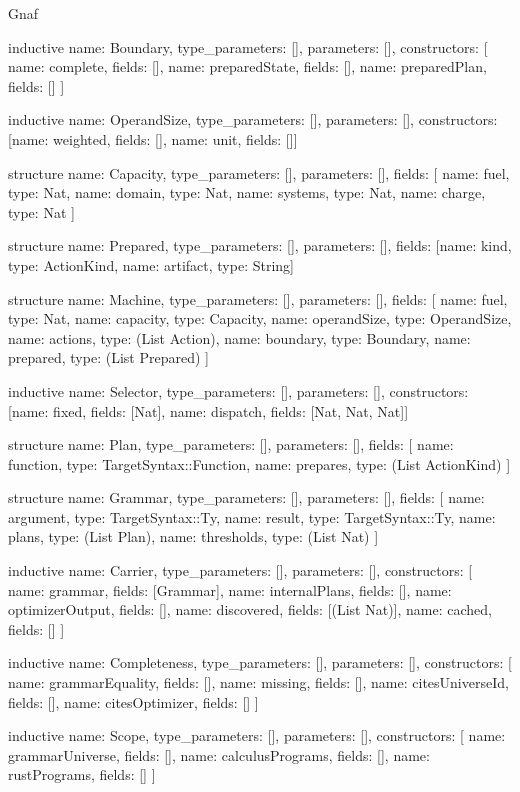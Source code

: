 \begin{lexlean}{Gnaf}
\begin{semanticmodule}
inductive{
  name: Boundary,
  type_parameters: [],
  parameters: [],
  constructors: [
    {name: complete, fields: []},
    {name: preparedState, fields: []},
    {name: preparedPlan, fields: []}
  ]
}

inductive{
  name: OperandSize,
  type_parameters: [],
  parameters: [],
  constructors: [{name: weighted, fields: []}, {name: unit, fields: []}]
}

structure{
  name: Capacity,
  type_parameters: [],
  parameters: [],
  fields: [
    {name: fuel, type: Nat},
    {name: domain, type: Nat},
    {name: systems, type: Nat},
    {name: charge, type: Nat}
  ]
}

structure{
  name: Prepared,
  type_parameters: [],
  parameters: [],
  fields: [{name: kind, type: ActionKind}, {name: artifact, type: String}]
}

structure{
  name: Machine,
  type_parameters: [],
  parameters: [],
  fields: [
    {name: fuel, type: Nat},
    {name: capacity, type: Capacity},
    {name: operandSize, type: OperandSize},
    {name: actions, type: (List Action)},
    {name: boundary, type: Boundary},
    {name: prepared, type: (List Prepared)}
  ]
}

inductive{
  name: Selector,
  type_parameters: [],
  parameters: [],
  constructors: [{name: fixed, fields: [Nat]}, {name: dispatch, fields: [Nat, Nat, Nat]}]
}

structure{
  name: Plan,
  type_parameters: [],
  parameters: [],
  fields: [
    {name: function, type: TargetSyntax::Function},
    {name: prepares, type: (List ActionKind)}
  ]
}

structure{
  name: Grammar,
  type_parameters: [],
  parameters: [],
  fields: [
    {name: argument, type: TargetSyntax::Ty},
    {name: result, type: TargetSyntax::Ty},
    {name: plans, type: (List Plan)},
    {name: thresholds, type: (List Nat)}
  ]
}

inductive{
  name: Carrier,
  type_parameters: [],
  parameters: [],
  constructors: [
    {name: grammar, fields: [Grammar]},
    {name: internalPlans, fields: []},
    {name: optimizerOutput, fields: []},
    {name: discovered, fields: [(List Nat)]},
    {name: cached, fields: []}
  ]
}

inductive{
  name: Completeness,
  type_parameters: [],
  parameters: [],
  constructors: [
    {name: grammarEquality, fields: []},
    {name: missing, fields: []},
    {name: citesUniverseId, fields: []},
    {name: citesOptimizer, fields: []}
  ]
}

inductive{
  name: Scope,
  type_parameters: [],
  parameters: [],
  constructors: [
    {name: grammarUniverse, fields: []},
    {name: calculusPrograms, fields: []},
    {name: rustPrograms, fields: []}
  ]
}


\end{semanticmodule}
\end{lexlean}
